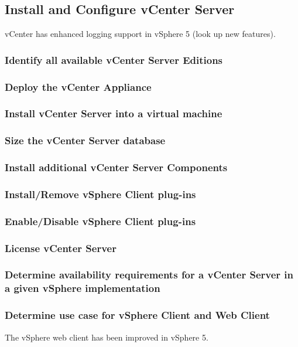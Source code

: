 \subsection{Install and Configure vCenter Server}

vCenter has enhanced logging support in vSphere 5 (look up new features).

\subsubsection{Identify all available vCenter Server Editions}

\subsubsection{Deploy the vCenter Appliance}

\subsubsection{Install vCenter Server into a virtual machine}

\subsubsection{Size the vCenter Server database}

\subsubsection{Install additional vCenter Server Components}

\subsubsection{Install/Remove vSphere Client plug-ins}

\subsubsection{Enable/Disable vSphere Client plug-ins}

\subsubsection{License vCenter Server}

\subsubsection{Determine availability requirements for a vCenter Server in a given vSphere implementation}

\subsubsection{Determine use case for vSphere Client and Web Client}

The vSphere web client has been improved in vSphere 5.
